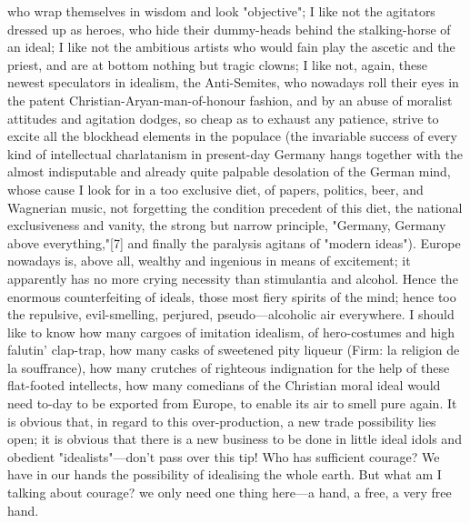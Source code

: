 \documentclass[12pt]{article}
\begin{document}
who wrap themselves in wisdom and look "objective"; I like not the agitators dressed up as heroes, who hide their dummy-heads behind the stalking-horse of an ideal; I like not the ambitious artists who would fain play the ascetic and the priest, and are at bottom nothing but tragic clowns; I like not, again, these newest speculators in idealism, the Anti-Semites, who nowadays roll their eyes in the patent Christian-Aryan-man-of-honour fashion, and by an abuse of moralist attitudes and agitation dodges, so cheap as to exhaust any patience, strive to excite all the blockhead elements in the populace (the invariable success of every kind of intellectual charlatanism in present-day Germany hangs together with the almost indisputable and already quite palpable desolation of the German mind, whose cause I look for in a too exclusive diet, of papers, politics, beer, and Wagnerian music, not forgetting the condition precedent of this diet, the national exclusiveness and vanity, the strong but narrow principle, "Germany, Germany above everything,"[7] and finally the paralysis agitans of "modern ideas"). Europe nowadays is, above all, wealthy and ingenious in means of excitement; it apparently has no more crying necessity than stimulantia and alcohol. Hence the enormous counterfeiting of ideals, those most fiery spirits of the mind; hence too the repulsive, evil-smelling, perjured, pseudo---alcoholic air everywhere. I should like to know how many cargoes of imitation idealism, of hero-costumes and high falutin' clap-trap, how many casks of sweetened pity liqueur (Firm: la religion de la souffrance), how many crutches of righteous indignation for the help of these flat-footed intellects, how many comedians of the Christian moral ideal would need to-day to be exported from Europe, to enable its air to smell pure again. It is obvious that, in regard to this over-production, a new trade possibility lies open; it is obvious that there is a new business to be done in little ideal idols and obedient "idealists"---don't pass over this tip! Who has sufficient courage? We have in our hands the possibility of idealising the whole earth. But what am I talking about courage? we only need one thing here---a hand, a free, a very free hand.
\end{document}
